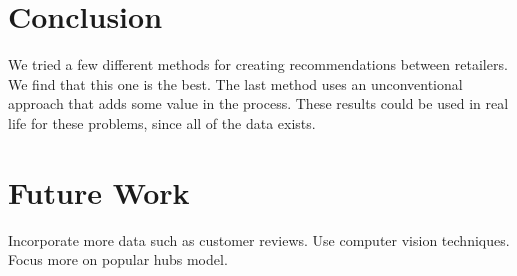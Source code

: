 \documentclass[11pt]{article}
\begin{document}
\section*{Conclusion}
We tried a few different methods for creating recommendations between
retailers. We find that this one is the best.
The last method uses an unconventional approach that adds some value in the
process. These results could be used in real life for these problems, since all
of the data exists.

\section*{Future Work}
Incorporate more data such as customer reviews. Use computer vision techniques.
Focus more on popular hubs model.

\begin{thebibliography}{9}

\end{thebibliography}
\end{document}
